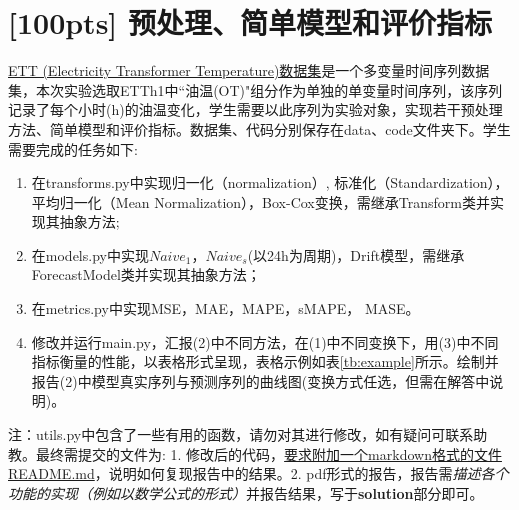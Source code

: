 \documentclass[a4paper,UTF8]{article}
\numberwithin{equation}{section}
\begin{document}
\section{[100pts] 预处理、简单模型和评价指标}
\href{https://github.com/zhouhaoyi/ETDataset}{ETT (Electricity Transformer Temperature)数据集}是一个多变量时间序列数据集，本次实验选取ETTh1中``油温(OT)"组分作为单独的单变量时间序列，该序列记录了每个小时(h)的油温变化，学生需要以此序列为实验对象，实现若干预处理方法、简单模型和评价指标。数据集、代码分别保存在data、code文件夹下。学生需要完成的任务如下:
\begin{enumerate}[ {(}1{)}]
\item 在transforms.py中实现归一化（normalization）, 标准化（Standardization），平均归一化（Mean Normalization），Box-Cox变换，需继承Transform类并实现其抽象方法;
\item 在models.py中实现$Naive_1$，$Naive_s$(以24h为周期)，Drift模型，需继承ForecastModel类并实现其抽象方法；
\item 在metrics.py中实现MSE，MAE，MAPE，sMAPE，	MASE。
\item 修改并运行main.py，汇报(2)中不同方法，在(1)中不同变换下，用(3)中不同指标衡量的性能，以表格形式呈现，表格示例如表\ref{tb:example}所示。绘制并报告(2)中模型真实序列与预测序列的曲线图(变换方式任选，但需在解答中说明)。
\end{enumerate}
注：utils.py中包含了一些有用的函数，请勿对其进行修改，如有疑问可联系助教。最终需提交的文件为: 1. 修改后的代码，\underline{要求附加一个markdown格式的文件README.md}，说明如何复现报告中的结果。2. pdf形式的报告，报告需\textit{描述各个功能的实现（例如以数学公式的形式）}并报告结果，写于\textbf{solution}部分即可。
\end{document}
